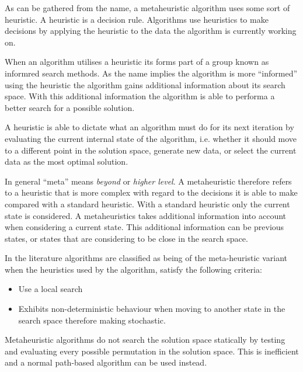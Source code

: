 As can be gathered from the name, a metaheuristic algorithm uses some sort of heuristic. A heuristic is a decision rule. Algorithms use heuristics to make decisions by applying the heuristic to the data the algorithm is currently working on\cite{AIModernApproach,NatureInspiredMetaHeuristic}.

When an algorithm utilises a heuristic its forms part of a group known as informred search methods. As the name implies the algorithm is more ``informed'' using the heuristic the algorithm gains additional information about its search space. With this additional information the algorithm is able to performa a better search for a possible solution\cite{AIModernApproach}.

A heuristic is able to dictate what an algorithm must do for its next iteration by evaluating the current internal state of the algorithm, i.e. whether it should move to a different point in the solution space, generate new data, or select the current data as the most optimal solution\cite{AIModernApproach,NatureInspiredMetaHeuristic}.

In general ``meta'' means \emph{beyond} or \emph{higher level}\cite{AIModernApproach,NatureInspiredMetaHeuristic}. A metaheuristic therefore refers to a heuristic that is more complex with regard to the decisions it is able to make compared with a standard heuristic\cite{AIModernApproach,NatureInspiredMetaHeuristic}. With a standard heuristic only the current state is considered\cite{AIModernApproach}. A metaheuristics takes additional information into account when considering a current state\cite{NatureInspiredMetaHeuristic}. This additional information can be previous states, or states that are considering to be close in the search space\cite{AIModernApproach, NatureInspiredMetaHeuristic}.

In the literature algorithms are classified as being of the meta-heuristic variant when the heuristics used by the algorithm, satisfy the following criteria\cite{AIModernApproach,NatureInspiredMetaHeuristic}:
\begin{itemize}
	\item Use a local search
	\item Exhibits non-deterministic behaviour when moving to another state in the search space therefore making stochastic.
\end{itemize}

Metaheuristic algorithms do not search the solution space statically by testing and evaluating every possible permutation in the solution space. This is inefficient and a normal path-based algorithm can be used instead\cite{MetaAgricultural}.

